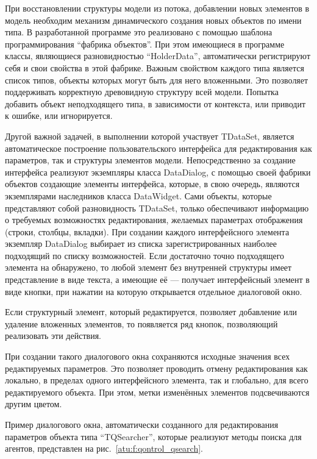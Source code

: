 При восстановлении структуры модели из потока,
добавлении новых элементов в модель необходим механизм
динамического создания новых объектов по имени типа.
В разработанной программе это реализовано с помощью
шаблона программирования ``фабрика объектов''.
При этом имеющиеся в программе классы, являющиеся разновидностью ``HolderData'',
автоматически регистрируют себя и свои свойства в этой фабрике.
Важным свойством каждого типа является список типов,
объекты которых могут быть для него вложенными. Это позволяет
поддерживать корректную древовидную структуру всей модели.
Попытка добавить объект неподходящего типа, в зависимости от контекста,
или приводит к ошибке, или игнорируется.

Другой важной задачей, в выполнении которой участвует TDataSet,
является автоматическое построение пользовательского интерфейса
для редактирования как параметров, так и структуры элементов модели.
Непосредственно за создание интерфейса реализуют экземпляры класса DataDialog,
с помощью своей фабрики объектов создающие элементы интерфейса,
которые, в свою очередь, являются экземплярами наследников класса DataWidget.
Сами объекты, которые представляют собой разновидность TDataSet,
только обеспечивают информацию о требуемых возможностях редактирования,
желаемых параметрах отображения (строки, столбцы, вкладки).
При создании каждого интерфейсного элемента экземпляр DataDialog
выбирает из списка зарегистрированных наиболее подходящий по списку возможностей.
Если достаточно точно подходящего элемента на обнаружено,
то любой элемент без внутренней структуры имеет представление в виде текста,
а имеющие её --- получает интерфейсный элемент в виде кнопки,
при нажатии на которую открывается отдельное диалоговой окно.

Если структурный элемент, который редактируется, позволяет добавление
или удаление вложенных элементов, то появляется ряд кнопок,
позволяющий реализовать эти действия.

При создании такого диалогового окна сохраняются исходные значения
всех редактируемых параметров. Это позволяет проводить отмену редактирования
как локально, в пределах одного интерфейсного элемента,
так и глобально, для всего редактируемого объекта. При этом,
метки изменённых элементов подсвечиваются другим цветом.

Пример диалогового окна, автоматически созданного для редактирования
параметров объекта типа ``TQSearcher'', которые реализуют методы
поиска для агентов, представлен на рис.~\ref{atu:f:qontrol_qsearch}.

